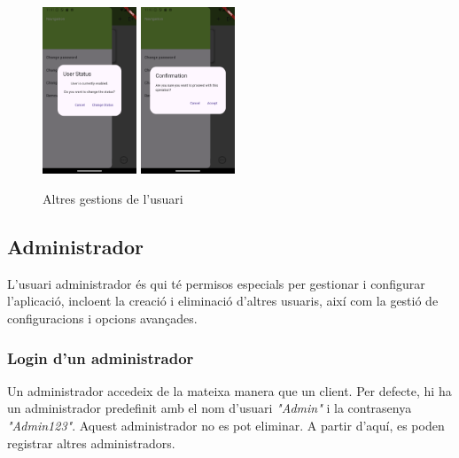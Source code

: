 \documentclass[a4paper,12pt,twoside]{ThesisStyle}
\begin{document}
\begin{figure}[h]
    \includegraphics[width=0.25\textwidth]{imatges/userGestion4.png}
    \includegraphics[width=0.25\textwidth]{imatges/userGestion5.png}
    \caption{Altres gestions de l'usuari}
    \label{fig: Altres gestions de l'usuari}
\end{figure}



\clearpage
\subsection{Administrador}
\label{subsec: Admin}

L'usuari administrador és qui té permisos especials per gestionar i configurar l'aplicació, incloent la creació i eliminació d'altres usuaris, així com la gestió de configuracions i opcions avançades.

\subsubsection{Login d'un administrador}
\label{subsubsec: Login d'un administrador}

Un administrador accedeix de la mateixa manera que un client. Per defecte, hi ha un administrador predefinit amb el nom d'usuari \textit{"Admin"} i la contrasenya \textit{"Admin123"}. Aquest administrador no es pot eliminar. A partir d'aquí, es poden registrar altres administradors.
\end{document}
